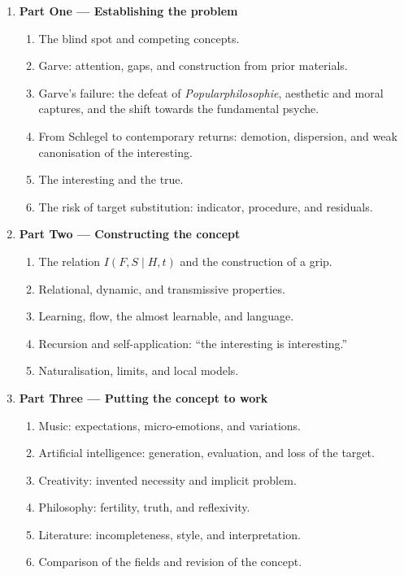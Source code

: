 \documentclass[11pt,a4paper]{article}
\begin{document}
\begin{enumerate}
  \item \textbf{Part One --- Establishing the problem}
    \begin{enumerate}
      \item The blind spot and competing concepts.
      \item Garve: attention, gaps, and construction from prior materials.
      \item Garve's failure: the defeat of \emph{Popularphilosophie}, aesthetic
            and moral captures, and the shift towards the fundamental psyche.
      \item From Schlegel to contemporary returns: demotion, dispersion, and
            weak canonisation of the interesting.
      \item The interesting and the true.
      \item The risk of target substitution: indicator, procedure, and residuals.
    \end{enumerate}
  \item \textbf{Part Two --- Constructing the concept}
    \begin{enumerate}
      \item The relation \(I(F,S\mid H,t)\) and the construction of a grip.
      \item Relational, dynamic, and transmissive properties.
      \item Learning, flow, the almost learnable, and language.
      \item Recursion and self-application: ``the interesting is interesting.''
      \item Naturalisation, limits, and local models.
    \end{enumerate}
  \item \textbf{Part Three --- Putting the concept to work}
    \begin{enumerate}
      \item Music: expectations, micro-emotions, and variations.
      \item Artificial intelligence: generation, evaluation, and loss of the
            target.
      \item Creativity: invented necessity and implicit problem.
      \item Philosophy: fertility, truth, and reflexivity.
      \item Literature: incompleteness, style, and interpretation.
      \item Comparison of the fields and revision of the concept.
    \end{enumerate}
\end{enumerate}
\end{document}
